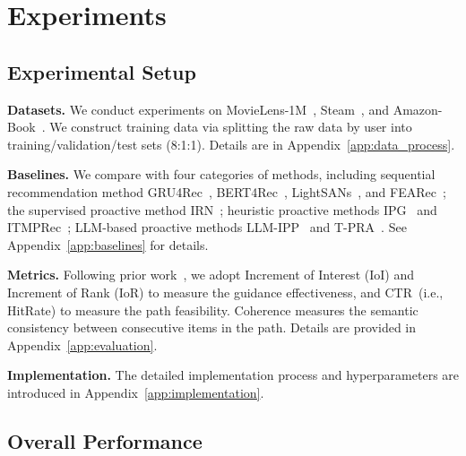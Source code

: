 \section{Experiments}
\label{sec:exp}

\subsection{Experimental Setup}

\textbf{Datasets.} We conduct experiments on MovieLens-1M~\cite{harper2015movielens}, Steam~\cite{kang2018self}, and Amazon-Book~\cite{ni2019justifying}. We construct training data via splitting the raw data by user into training/validation/test sets (8:1:1). Details are in Appendix~\ref{app:data_process}.

\textbf{Baselines.} We compare with four categories of methods, including sequential recommendation method GRU4Rec~\cite{hidasi2015session}, BERT4Rec~\cite{sun2019bert4rec}, LightSANs~\cite{fan2021lighter}, and FEARec~\cite{du2023frequency}; the supervised proactive method IRN~\cite{zhu2023influential}; heuristic proactive methods IPG~\cite{bi2024proactive} and ITMPRec~\cite{lian2025itmprec}; LLM-based proactive methods LLM-IPP~\cite{wang2025leveraging} and T-PRA~\cite{wang2025tunable}. See Appendix~\ref{app:baselines} for details.

\textbf{Metrics.} Following prior work~\cite{bi2024proactive,wang2025leveraging,wang2025tunable}, we adopt Increment of Interest (IoI) and Increment of Rank (IoR) to measure the guidance effectiveness, and CTR~(i.e., HitRate) to measure the path feasibility. Coherence measures the semantic consistency between consecutive items in the path. Details are provided in Appendix~\ref{app:evaluation}.

\textbf{Implementation.} The detailed implementation process and hyperparameters are introduced in Appendix~\ref{app:implementation}.

\subsection{Overall Performance}

